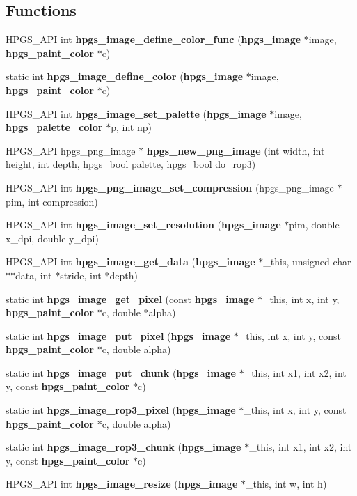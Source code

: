 \subsection*{Functions}
\begin{CompactItemize}
\item 
HPGS\_\-API int {\bf hpgs\_\-image\_\-define\_\-color\_\-func} ({\bf hpgs\_\-image} $\ast$image, {\bf hpgs\_\-paint\_\-color} $\ast$c)
\item 
static int {\bf hpgs\_\-image\_\-define\_\-color} ({\bf hpgs\_\-image} $\ast$image, {\bf hpgs\_\-paint\_\-color} $\ast$c)
\item 
HPGS\_\-API int {\bf hpgs\_\-image\_\-set\_\-palette} ({\bf hpgs\_\-image} $\ast$image, {\bf hpgs\_\-palette\_\-color} $\ast$p, int np)
\item 
HPGS\_\-API hpgs\_\-png\_\-image $\ast$ {\bf hpgs\_\-new\_\-png\_\-image} (int width, int height, int depth, hpgs\_\-bool palette, hpgs\_\-bool do\_\-rop3)
\item 
HPGS\_\-API int {\bf hpgs\_\-png\_\-image\_\-set\_\-compression} (hpgs\_\-png\_\-image $\ast$pim, int compression)
\item 
HPGS\_\-API int {\bf hpgs\_\-image\_\-set\_\-resolution} ({\bf hpgs\_\-image} $\ast$pim, double x\_\-dpi, double y\_\-dpi)
\item 
HPGS\_\-API int {\bf hpgs\_\-image\_\-get\_\-data} ({\bf hpgs\_\-image} $\ast$\_\-this, unsigned char $\ast$$\ast$data, int $\ast$stride, int $\ast$depth)
\item 
static int {\bf hpgs\_\-image\_\-get\_\-pixel} (const {\bf hpgs\_\-image} $\ast$\_\-this, int x, int y, {\bf hpgs\_\-paint\_\-color} $\ast$c, double $\ast$alpha)
\item 
static int {\bf hpgs\_\-image\_\-put\_\-pixel} ({\bf hpgs\_\-image} $\ast$\_\-this, int x, int y, const {\bf hpgs\_\-paint\_\-color} $\ast$c, double alpha)
\item 
static int {\bf hpgs\_\-image\_\-put\_\-chunk} ({\bf hpgs\_\-image} $\ast$\_\-this, int x1, int x2, int y, const {\bf hpgs\_\-paint\_\-color} $\ast$c)
\item 
static int {\bf hpgs\_\-image\_\-rop3\_\-pixel} ({\bf hpgs\_\-image} $\ast$\_\-this, int x, int y, const {\bf hpgs\_\-paint\_\-color} $\ast$c, double alpha)
\item 
static int {\bf hpgs\_\-image\_\-rop3\_\-chunk} ({\bf hpgs\_\-image} $\ast$\_\-this, int x1, int x2, int y, const {\bf hpgs\_\-paint\_\-color} $\ast$c)
\item 
HPGS\_\-API int {\bf hpgs\_\-image\_\-resize} ({\bf hpgs\_\-image} $\ast$\_\-this, int w, int h)
$$
\end{CompactItemize}
